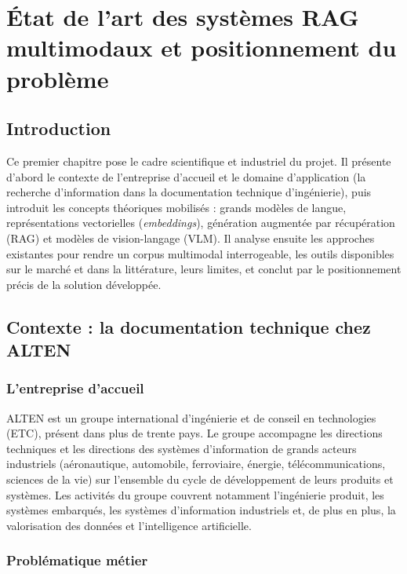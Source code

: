 \chapter{État de l'art des systèmes RAG multimodaux et positionnement du problème}
\label{chap:etat-art}

\section{Introduction}

Ce premier chapitre pose le cadre scientifique et industriel du projet. Il présente
d'abord le contexte de l'entreprise d'accueil et le domaine d'application (la recherche
d'information dans la documentation technique d'ingénierie), puis introduit les concepts
théoriques mobilisés : grands modèles de langue, représentations vectorielles
(\emph{embeddings}), génération augmentée par récupération (RAG) et modèles de
vision-langage (VLM). Il analyse ensuite les approches existantes pour rendre un corpus
multimodal interrogeable, les outils disponibles sur le marché et dans la littérature,
leurs limites, et conclut par le positionnement précis de la solution développée.

\section{Contexte : la documentation technique chez ALTEN}

\subsection{L'entreprise d'accueil}

ALTEN est un groupe international d'ingénierie et de conseil en technologies (ETC), présent
dans plus de trente pays. Le groupe accompagne les directions techniques et les directions
des systèmes d'information de grands acteurs industriels (aéronautique, automobile,
ferroviaire, énergie, télécommunications, sciences de la vie) sur l'ensemble du cycle de
développement de leurs produits et systèmes. Les activités du groupe couvrent notamment
l'ingénierie produit, les systèmes embarqués, les systèmes d'information industriels et,
de plus en plus, la valorisation des données et l'intelligence artificielle.

\subsection{Problématique métier}

